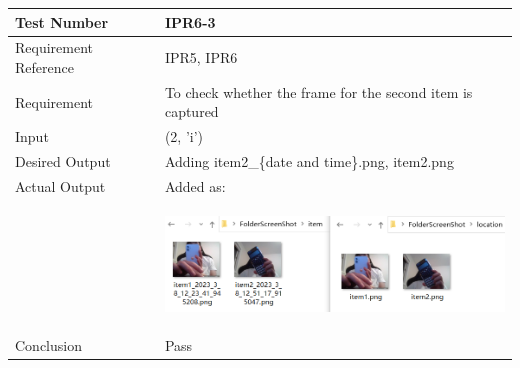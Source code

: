 \documentclass[12pt, titlepage]{article}
\begin{document}
\begin{table}[H]
\begin{center}
\begin{tabular}{|l | m{9cm}|}
\hline
  Test Number & IPR6-3\\
  \hline
  Requirement Reference & IPR5, IPR6\\
  \hline
  Requirement & To check whether the frame for the second item is captured\\
  \hline
  Input & (2, 'i')\\
  \hline
  Desired Output & Adding item2\_\{date and time\}.png, item2.png\\
  \hline
  Actual Output & Added as:\\&\includegraphics[width=90mm, height=33mm]{UT3.png}\\
  \hline
  Conclusion & Pass\\
  \hline
\end{tabular}
\end{center}           
\end{table}
\end{document}
